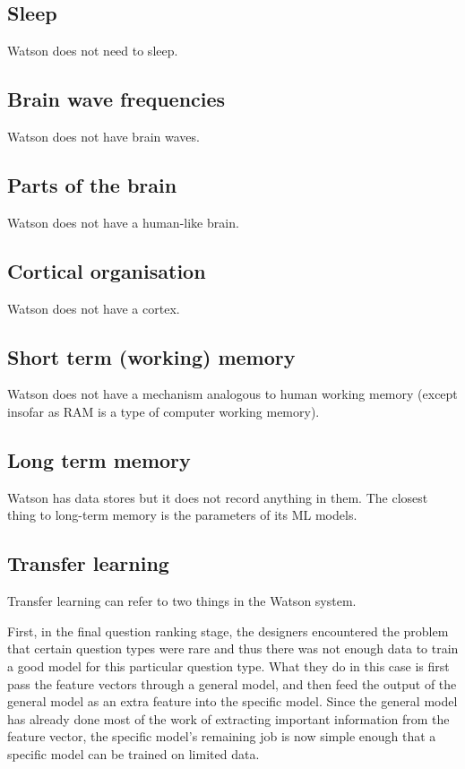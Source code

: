 \documentclass[10pt,a4paper]{article}
\begin{document}
\subsection{Sleep}
Watson does not need to sleep.

\subsection{Brain wave frequencies}
Watson does not have brain waves.

\subsection{Parts of the brain}
Watson does not have a human-like brain.

\subsection{Cortical organisation}
Watson does not have a cortex.

\subsection{Short term (working) memory}
Watson does not have a mechanism analogous to human working memory (except insofar as RAM is a type of computer working memory).

\subsection{Long term memory}
Watson has data stores but it does not record anything in them. The closest thing to long-term memory is the parameters of its ML models.

\subsection{Transfer learning}
Transfer learning can refer to two things in the Watson system.

First, in the final question ranking stage, the designers encountered the problem that certain question types were rare and thus there was not enough data to train a good model for this particular question type. What they do in this case is first pass the feature vectors through a general model, and then feed the output of the general model as an extra feature into the specific model. Since the general model has already done most of the work of extracting important information from the feature vector, the specific model's remaining job is now simple enough that a specific model can be trained on limited data.
\end{document}
